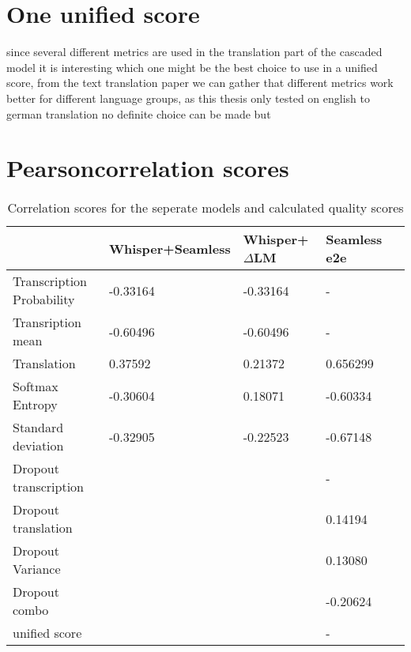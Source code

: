 \section{One unified score}
since several different metrics are used in the translation part of the cascaded model it is interesting which one might be the best choice to use in a unified score, from the text translation paper \cite{fomicheva2020unsupervised} we can gather that different metrics work better for different language groups, as this thesis only tested on english to german translation no definite choice can be made but



\section{Pearsoncorrelation scores}
\begin{table}[ht]
\begin{tabular}{l|llll}
 &  Whisper+Seamless & Whisper+$\Delta$LM&  Seamless e2e\\ \hline
 Transcription Probability& -0.33164 & -0.33164&  -  \\
 Transription mean & -0.60496 & -0.60496  &   - \\ \hline
Translation& 0.37592 &  0.21372  & 0.656299\\ 
Softmax Entropy& -0.30604   & 0.18071 & -0.60334 \\
Standard deviation & -0.32905  & -0.22523 & -0.67148 \\ \hline


Dropout transcription &  &  & -\\
Dropout translation & & & 0.14194\\

Dropout Variance & & & 0.13080\\
Dropout combo & & & -0.20624\\
\hline
unified score   &  &  & - 



\end{tabular}
\label{results}
\caption{Correlation scores for the seperate models and calculated quality scores}
\end{table}
